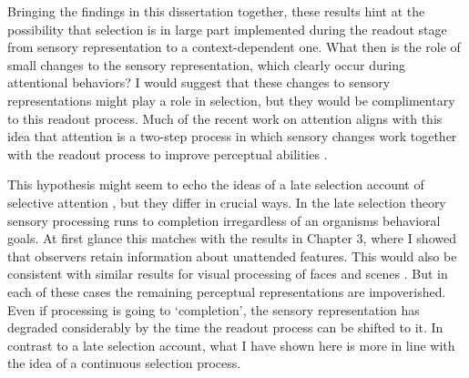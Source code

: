 Bringing the findings in this dissertation together, these results hint at the possibility that selection is in large part implemented during the readout stage from sensory representation to a context-dependent one. What then is the role of small changes to the sensory representation, which clearly occur during attentional behaviors? I would suggest that these changes to sensory representations might play a role in selection, but they would be complimentary to this readout process. Much of the recent work on attention aligns with this idea that attention is a two-step process in which sensory changes work together with the readout process to improve perceptual abilities \citep{Pestilli2011-gi,Ruff2018-bm,Snyder2018-yr,Rabinowitz2015-uz}.

This hypothesis might seem to echo the ideas of a late selection account of selective attention \citep{Deutsch1963-ac}, but they differ in crucial ways. In the late selection theory sensory processing runs to completion irregardless of an organisms behavioral goals. At first glance this matches with the results in Chapter 3, where I showed that observers retain information about unattended features. This would also be consistent with similar results for visual processing of faces and scenes \citep{Li2002-ji,Reddy2006-ua}. But in each of these cases the remaining perceptual representations are impoverished. Even if processing is going to `completion', the sensory representation has degraded considerably by the time the readout process can be shifted to it. In contrast to a late selection account, what I have shown here is more in line with the idea of a continuous selection process.

